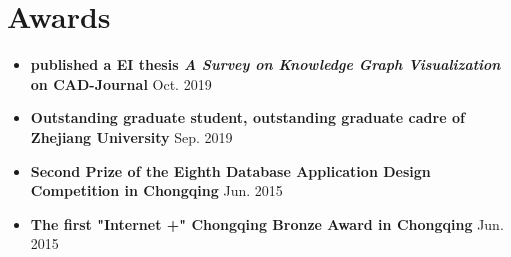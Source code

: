 \documentclass[letterpaper,11pt]{article}
\newcommand{\resumeSubHeadingListStart}{\begin{itemize}[leftmargin=*]}
\newcommand{\resumeSubHeadingListEnd}{\end{itemize}}
\begin{document}
 \section{Awards}
 \resumeSubHeadingListStart
 \item{
 	\textbf{published a EI thesis  \textit{A Survey on Knowledge Graph Visualization} on CAD-Journal}
 	\hfill
 	\textbf{}{Oct. 2019}
   }
  \item{
 	\textbf{Outstanding graduate student, outstanding graduate cadre of Zhejiang University}
 	\hfill
 	\textbf{}{Sep. 2019}
   }
  \item{
  	\textbf{Second Prize of the Eighth Database Application Design Competition in Chongqing}
  	\hfill
  	\textbf{}{Jun. 2015}
   }
  \item{
  	\textbf{The first "Internet +" Chongqing Bronze Award in Chongqing}
  	\hfill
 	\textbf{}{Jun. 2015}
   }
 \resumeSubHeadingListEnd


\end{document}

